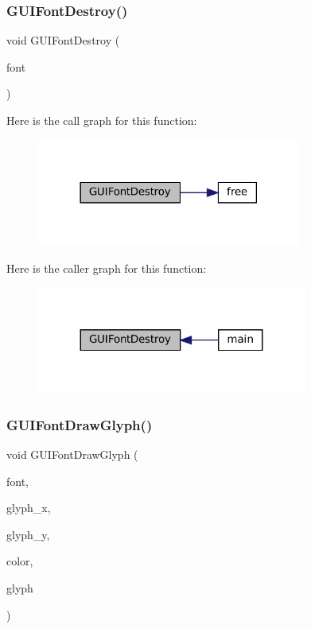 \subsubsection{\texorpdfstring{G\+U\+I\+Font\+Destroy()}{GUIFontDestroy()}}
{\footnotesize\ttfamily void G\+U\+I\+Font\+Destroy (\begin{DoxyParamCaption}\item[{struct G\+U\+I\+Font $\ast$}]{font }\end{DoxyParamCaption})}

Here is the call graph for this function\+:
\nopagebreak
\begin{figure}[H]
\begin{center}
\leavevmode
\includegraphics[width=246pt]{3ds_2gui-font_8c_aa30d3bddfd055be2a203306973eb2b6a_cgraph}
\end{center}
\end{figure}
Here is the caller graph for this function\+:
\nopagebreak
\begin{figure}[H]
\begin{center}
\leavevmode
\includegraphics[width=251pt]{3ds_2gui-font_8c_aa30d3bddfd055be2a203306973eb2b6a_icgraph}
\end{center}
\end{figure}
\mbox{\label{3ds_2gui-font_8c_a6afd907275ce70a3b44246e55bb9eb99}} 
\subsubsection{\texorpdfstring{G\+U\+I\+Font\+Draw\+Glyph()}{GUIFontDrawGlyph()}}
{\footnotesize\ttfamily void G\+U\+I\+Font\+Draw\+Glyph (\begin{DoxyParamCaption}\item[{const struct G\+U\+I\+Font $\ast$}]{font,  }\item[{\mbox{\hyperlink{ioapi_8h_a787fa3cf048117ba7123753c1e74fcd6}{int}}}]{glyph\+\_\+x,  }\item[{\mbox{\hyperlink{ioapi_8h_a787fa3cf048117ba7123753c1e74fcd6}{int}}}]{glyph\+\_\+y,  }\item[{uint32\+\_\+t}]{color,  }\item[{uint32\+\_\+t}]{glyph }\end{DoxyParamCaption})}

